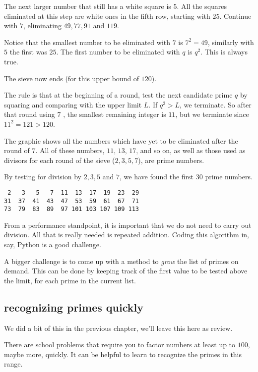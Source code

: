 \documentclass[11pt, oneside]{article}
\begin{document}
The next larger number that still has a white square is $5$.  All the squares eliminated at this step are white ones in the fifth row, starting with $25$.  Continue with $7$, eliminating $49, 77, 91$ and $119$.

Notice that the smallest number to be eliminated with $7$ is $7^2 = 49$, similarly with $5$ the first was $25$.  The first number to be eliminated with $q$ is $q^2$.  This is always true.

The sieve now ends (for this upper bound of $120$).

The rule is that at the beginning of a round, test the next candidate prime $q$ by squaring and comparing with the upper limit $L$.  If $q^2 > L$,  we terminate.  So after that round using $7$ , the smallest remaining integer is $11$, but we terminate since $11^2 = 121 > 120$.

The graphic shows all the numbers which have yet to be eliminated after the round of $7$.   All of these numbers, $11$, $13$, $17$, and so on, as well as those used as divisors for each round of the sieve ($2, 3, 5, 7$), are prime numbers.

By testing for division by $2, 3, 5$ and $7$, we have found the first $30$ prime numbers.

\begin{verbatim}
 2   3   5   7  11  13  17  19  23  29
31  37  41  43  47  53  59  61  67  71 
73  79  83  89  97 101 103 107 109 113
\end{verbatim}

From a performance standpoint, it is important that we do not need to carry out division.  All that is really needed is repeated addition.  Coding this algorithm in, say, Python is a good challenge.  

A bigger challenge is to come up with a method to \emph{grow} the list of primes on demand.  This can be done by keeping track of the first value to be tested above the limit, for each prime in the current list.

\subsection*{recognizing primes quickly}

We did a bit of this in the previous chapter, we'll leave this here as review.

There are school problems that require you to factor numbers at least up to $100$, maybe more, quickly.  It can be helpful to learn to recognize the primes in this range.
\end{document}
